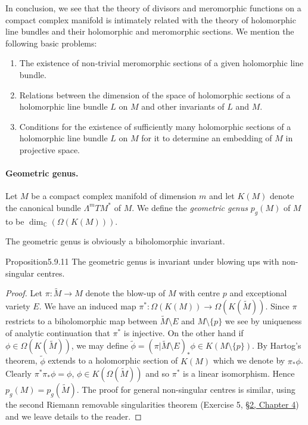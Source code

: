 In conclusion, we see that the theory of divisors and meromorphic functions on a compact complex manifold is intimately related with the theory of holomorphic line bundles and their holomorphic and meromorphic sections. We mention the following basic problems:
\begin{enumerate}
\item The existence of non-trivial meromorphic sections of a given holomorphic line bundle.
\item Relations between the dimension of the space of holomorphic sections of a holomorphic line bundle $L$ on $M$ and other invariants of $L$ and $M$.
\item Conditions for the existence of sufficiently many holomorphic sections of a holomorphic line bundle $L$ on $M$ for it to determine an embedding of $M$ in projective space.
\end{enumerate}
\paragraph{Geometric genus.}
Let $M$ be a compact complex manifold of dimension $m$ and let $K(M)$ denote the canonical bundle $\Lambda^mTM^*$ of $M$. We define the \emph{geometric genus} $p_g(M)$ of $M$ to be $\dim_{\mathbb C}(\Omega(K(M)))$.

The geometric genus is obviously a biholomorphic invariant.
\begin{originaltheorem}{Proposition}{5.9.11}
The geometric genus is invariant under blowing ups with non-singular centres.
\end{originaltheorem}
\begin{proof}
Let $\pi:\widetilde M\to M$ denote the blow-up of $M$ with centre $p$ and exceptional variety $E$. We have an induced map $\pi^*:\Omega(K(M))\to\Omega(K(\widetilde M))$. Since $\pi$ restricts to a biholomorphic map between $\widetilde M\setminus E$ and $M\setminus\{p\}$ we see by uniqueness of analytic continuation that $\pi^*$ is injective. On the other hand if $\phi\in\Omega(K(\widetilde M))$, we may define $\widetilde\phi=(\pi|\widetilde M\setminus E)_*\phi\in K(M\setminus\{p\})$. By Hartog's theorem, $\widetilde\phi$ extends to a holomorphic section of $K(M)$ which we denote by $\pi_*\phi$. Clearly $\pi^*\pi_*\phi=\phi$, $\phi\in K(\Omega(\widetilde M))$ and so $\pi^*$ is a linear isomorphism. Hence $p_g(M)=p_g(\widetilde M)$. The proof for general non-singular centres is similar, using the second Riemann removable singularities theorem (Exercise 5, \hyperref[sec:4:2]{\S2, Chapter 4}) and we leave details to the reader.
\end{proof}
